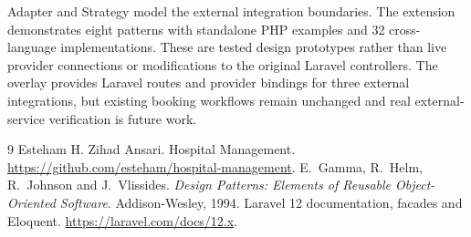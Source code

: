 \documentclass[11pt,a4paper]{article}
\begin{document}
Adapter and Strategy model the external integration boundaries. The extension demonstrates eight patterns with standalone PHP examples and 32 cross-language implementations. These are tested design prototypes rather than live provider connections or modifications to the original Laravel controllers. The overlay provides Laravel routes and provider bindings for three external integrations, but existing booking workflows remain unchanged and real external-service verification is future work.

\begin{thebibliography}{9}
 Esteham H. Zihad Ansari. Hospital Management. \url{https://github.com/esteham/hospital-management}.
 E.~Gamma, R.~Helm, R.~Johnson and J.~Vlissides. \emph{Design Patterns: Elements of Reusable Object-Oriented Software}. Addison-Wesley, 1994.
 Laravel 12 documentation, facades and Eloquent. \url{https://laravel.com/docs/12.x}.
\end{thebibliography}
\end{document}
